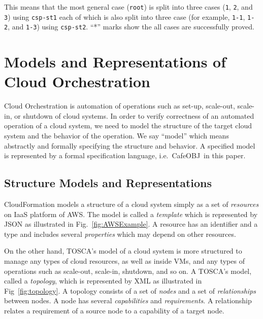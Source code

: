 \documentclass[12pt]{report}
\newcommand{\cafeobj}{{\sf CafeOBJ}~}
\begin{document}
\normalsize
This means that the most general case ({\tt root}) is split into three
cases ({\tt 1}, {\tt 2}, and {\tt 3}) using {\tt csp-st1} each of
which is also split into three case (for example, {\tt 1-1},
{\tt 1-2}, and {\tt 1-3}) using {\tt csp-st2}.  ``*'' marks show the
all cases are successfully proved.

\chapter{Models and Representations of Cloud Orchestration}
\label{chap:model}
Cloud Orchestration is automation of operations such as set-up,
scale-out, scale-in, or shutdown of cloud systems. In order to verify
correctness of an automated operation of a cloud system, we need to
model the structure of the target cloud system and the behavior of the
operation. We say ``model'' which means abstractly and formally
specifying the structure and behavior. A specified model is represented
by a formal specification language, i.e.\ \cafeobj in this paper.

\section{Structure Models and Representations}
\label{sec:structuremodel}
CloudFormation models a structure of a cloud system simply as a set
of {\it resources} on IaaS platform of AWS. The model is called a {\it
  template} which is represented by JSON as illustrated in
Fig.~\ref{fig:AWSExample}.  A resource has an identifier and a type
and includes several {\it properties} which may depend on other
resources.

On the other hand, TOSCA's model of a cloud system is more structured
to manage any types of cloud resources, as well as inside VMs, and any
types of operations such as scale-out, scale-in, shutdown, and so on.
A TOSCA's model, called a {\it topology}, which is represented by XML
as illustrated in Fig~\ref{fig:topology}. A topology consists of a set
of {\it nodes} and a set of {\it relationships} between nodes. A node
has several {\it capabilities} and {\it requirements}. A relationship
relates a requirement of a source node to a capability of a target
node.
\end{document}
